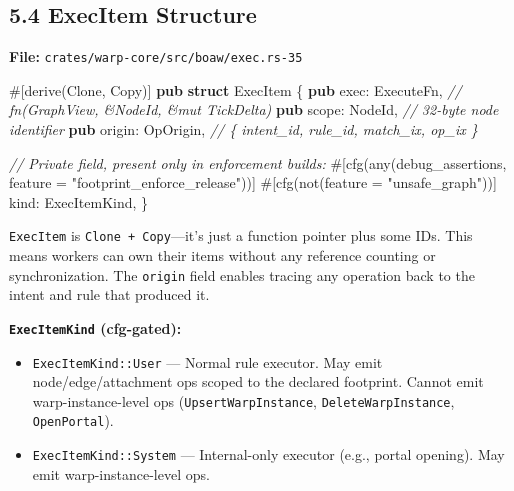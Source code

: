 \documentclass[11pt]{book}
\newenvironment{Shaded}{}{}
\newcommand{\AttributeTok}[1]{\textcolor[rgb]{0.49,0.56,0.16}{#1}}
\newcommand{\BuiltInTok}[1]{\textcolor[rgb]{0.00,0.50,0.00}{#1}}
\newcommand{\CommentTok}[1]{\textcolor[rgb]{0.38,0.63,0.69}{\textit{#1}}}
\newcommand{\KeywordTok}[1]{\textcolor[rgb]{0.00,0.44,0.13}{\textbf{#1}}}
\newcommand{\NormalTok}[1]{#1}
\newcommand{\OperatorTok}[1]{\textcolor[rgb]{0.40,0.40,0.40}{#1}}
\newcommand{\StringTok}[1]{\textcolor[rgb]{0.25,0.44,0.63}{#1}}
\providecommand{\tightlist}{%
  \setlength{\itemsep}{0pt}\setlength{\parskip}{0pt}}
\begin{document}
\subsection{5.4 ExecItem Structure}\label{execitem-structure}

\textbf{File:} \texttt{crates/warp-core/src/boaw/exec.rs-35}

\begin{Shaded}
\begin{Highlighting}[]
\AttributeTok{\#[}\NormalTok{derive}\AttributeTok{(}\BuiltInTok{Clone}\OperatorTok{,} \BuiltInTok{Copy}\AttributeTok{)]}
\KeywordTok{pub} \KeywordTok{struct}\NormalTok{ ExecItem }\OperatorTok{\{}
    \KeywordTok{pub}\NormalTok{ exec}\OperatorTok{:}\NormalTok{ ExecuteFn}\OperatorTok{,}     \CommentTok{// fn(GraphView, \&NodeId, \&mut TickDelta)}
    \KeywordTok{pub}\NormalTok{ scope}\OperatorTok{:}\NormalTok{ NodeId}\OperatorTok{,}       \CommentTok{// 32{-}byte node identifier}
    \KeywordTok{pub}\NormalTok{ origin}\OperatorTok{:}\NormalTok{ OpOrigin}\OperatorTok{,}    \CommentTok{// \{ intent\_id, rule\_id, match\_ix, op\_ix \}}

    \CommentTok{// Private field, present only in enforcement builds:}
    \AttributeTok{\#[}\NormalTok{cfg}\AttributeTok{(}\NormalTok{any}\AttributeTok{(}\NormalTok{debug\_assertions}\OperatorTok{,}\NormalTok{ feature }\OperatorTok{=} \StringTok{"footprint\_enforce\_release"}\AttributeTok{))]}
    \AttributeTok{\#[}\NormalTok{cfg}\AttributeTok{(}\NormalTok{not}\AttributeTok{(}\NormalTok{feature }\OperatorTok{=} \StringTok{"unsafe\_graph"}\AttributeTok{))]}
\NormalTok{    kind}\OperatorTok{:}\NormalTok{ ExecItemKind}\OperatorTok{,}
\OperatorTok{\}}
\end{Highlighting}
\end{Shaded}

\begin{tourguide}
\texttt{ExecItem} is \texttt{Clone + Copy}---it's just a function pointer plus some IDs. This means workers can own their items without any reference counting or synchronization. The \texttt{origin} field enables tracing any operation back to the intent and rule that produced it.
\end{tourguide}

\textbf{\texttt{ExecItemKind} (cfg-gated):}

\begin{itemize}
\tightlist
\item
  \texttt{ExecItemKind::User} --- Normal rule executor. May emit
  node/edge/attachment ops scoped to the declared footprint. Cannot emit
  warp-instance-level ops (\texttt{UpsertWarpInstance},
  \texttt{DeleteWarpInstance}, \texttt{OpenPortal}).
\item
  \texttt{ExecItemKind::System} --- Internal-only executor (e.g., portal
  opening). May emit warp-instance-level ops.
\end{itemize}
\end{document}
